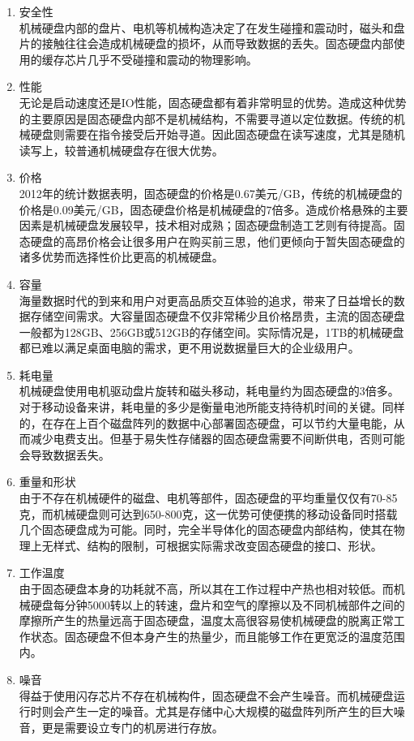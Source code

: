 \begin{enumerate}
\item 安全性
\\机械硬盘内部的盘片、电机等机械构造决定了在发生碰撞和震动时，磁头和盘片的接触往往会造成机械硬盘的损坏，从而导致数据的丢失。固态硬盘内部使用的缓存芯片几乎不受碰撞和震动的物理影响。
\item 性能
\\无论是启动速度还是IO性能，固态硬盘都有着非常明显的优势。造成这种优势的主要原因是固态硬盘内部不是机械结构，不需要寻道以定位数据。传统的机械硬盘则需要在指令接受后开始寻道。因此固态硬盘在读写速度，尤其是随机读写上，较普通机械硬盘存在很大优势。
\item 价格
\\2012年的统计数据表明，固态硬盘的价格是0.67美元/GB，传统的机械硬盘的价格是0.09美元/GB，固态硬盘价格是机械硬盘的7倍多。造成价格悬殊的主要因素是机械硬盘发展较早，技术相对成熟；固态硬盘制造工艺则有待提高。固态硬盘的高昂价格会让很多用户在购买前三思，他们更倾向于暂失固态硬盘的诸多优势而选择性价比更高的机械硬盘。
\item 容量
\\海量数据时代的到来和用户对更高品质交互体验的追求，带来了日益增长的数据存储空间需求。大容量固态硬盘不仅非常稀少且价格昂贵，主流的固态硬盘一般都为128GB、256GB或512GB的存储空间。实际情况是，1TB的机械硬盘都已难以满足桌面电脑的需求，更不用说数据量巨大的企业级用户。
\item 耗电量
\\机械硬盘使用电机驱动盘片旋转和磁头移动，耗电量约为固态硬盘的3倍多。对于移动设备来讲，耗电量的多少是衡量电池所能支持待机时间的关键。同样的，在存在上百个磁盘阵列的数据中心部署固态硬盘，可以节约大量电能，从而减少电费支出。但基于易失性存储器的固态硬盘需要不间断供电，否则可能会导致数据丢失。
\item 重量和形状
\\由于不存在机械硬件的磁盘、电机等部件，固态硬盘的平均重量仅仅有70-85克，而机械硬盘则可达到650-800克，这一优势可使便携的移动设备同时搭载几个固态硬盘成为可能。同时，完全半导体化的固态硬盘内部结构，使其在物理上无样式、结构的限制，可根据实际需求改变固态硬盘的接口、形状。
\item 工作温度
\\由于固态硬盘本身的功耗就不高，所以其在工作过程中产热也相对较低。而机械硬盘每分钟5000转以上的转速，盘片和空气的摩擦以及不同机械部件之间的摩擦所产生的热量远高于固态硬盘，温度太高很容易使机械硬盘的脱离正常工作状态。固态硬盘不但本身产生的热量少，而且能够工作在更宽泛的温度范围内。
\item 噪音
\\ 得益于使用闪存芯片不存在机械构件，固态硬盘不会产生噪音。而机械硬盘运行时则会产生一定的噪音。尤其是存储中心大规模的磁盘阵列所产生的巨大噪音，更是需要设立专门的机房进行存放。
\end{enumerate}

